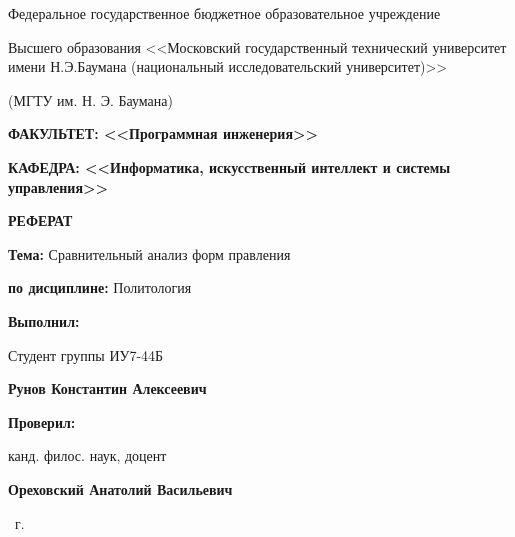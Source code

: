 \begin{titlepage}
    \begin{center}
        {
            Федеральное государственное бюджетное образовательное учреждение

            Высшего образования <<Московский государственный технический университет имени Н.Э.Баумана (национальный исследовательский университет)>>

            (МГТУ им. Н. Э. Баумана)
        }

        \vspace{3cm}

        \begin{flushleft}
            \textbf{ФАКУЛЬТЕТ: <<Программная инженерия>>}

            \textbf{КАФЕДРА: <<Информатика, искусственный интеллект и системы управления>>}
        \end{flushleft}

        \vspace{2cm}

        {
            \Huge{\textbf{РЕФЕРАТ}}
        }

        \textbf{Тема:} Сравнительный анализ форм правления

        \textbf{по дисциплине:} Политология

        \vfill

        \begin{flushright}
            \textbf{Выполнил:}

            Студент группы ИУ7-44Б

            \textbf{Рунов Константин Алексеевич}

            \textbf{Проверил:}

            канд. филос. наук, доцент

            \textbf{Ореховский Анатолий Васильевич}
        \end{flushright}

        \the\year\ г.

    \end{center}
\end{titlepage}
